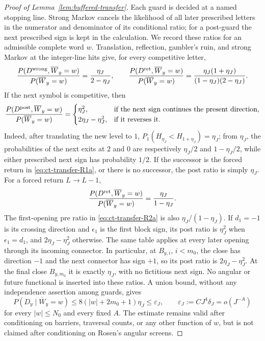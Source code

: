 \begin{proof}[Proof of Lemma~\ref{lem:buffered-transfer}]
Each guard is decided at a named stopping line. Strong Markov cancels the
likelihood of all later prescribed letters in the numerator and denominator
of its conditional ratio; for a post-guard the next prescribed sign is kept
in the calculation. We record these ratios for an admissible complete word
$w$.  Translation, reflection, gambler's ruin, and strong Markov at the
integer-line hits give, for every competitive letter,
\begin{equation}
\frac{P(D^{\rm wrong},\overline W_y=w)}{P(\overline W_y=w)}
       =\frac{\eta_J}{2-\eta_J},\qquad
 \frac{P(D^{\rm ret},\overline W_y=w)}{P(\overline W_y=w)}
       =\frac{\eta_J(1+\eta_J)}
          {(1-\eta_J)(2-\eta_J)}.\label{eq:ct-transfer-R2b}
\end{equation}
If the next symbol is competitive, then
\begin{equation}
\frac{P(D^{\rm post},\overline W_y=w)}{P(\overline W_y=w)}
 =\begin{cases}
    \eta_J^2,&\text{if the next sign continues the present direction},\\
    2\eta_J-\eta_J^2,&\text{if it reverses it}.
   \end{cases}\label{eq:ct-transfer-R2c}
\end{equation}
Indeed, after translating the new level to $1$,
$P_1(H_{\eta_J}<H_{1+\eta_J})=\eta_J$; from $\eta_J$, the
probabilities of the next exits at $2$ and $0$ are respectively
$\eta_J/2$ and $1-\eta_J/2$, while either prescribed next sign has
probability $1/2$.  If the successor is the forced return in \eqref{eq:ct-transfer-R1a}, or
there is no successor, the post ratio is simply $\eta_J$.  For a forced
return $L\to L-1$,
\begin{equation}
\frac{P(D^{\rm ret},\overline W_y=w)}{P(\overline W_y=w)}
       =\frac{\eta_J}{1-\eta_J}.\label{eq:ct-transfer-R2d}
\end{equation}
The first-opening pre ratio in \eqref{eq:ct-transfer-R2a} is also
$\eta_J/(1-\eta_J)$.  If $d_1=-1$ is its crossing direction and
$\epsilon_1$ is the first block sign, its post ratio is
$\eta_J^2$ when $\epsilon_1=d_1$, and
$2\eta_J-\eta_J^2$ otherwise.  The same table applies at every later
opening through its incoming connector.  In particular, at $B_{y,i}$,
$i<m_0$, the close has direction $-1$ and the next connector has sign
$+1$, so its post ratio is $2\eta_J-\eta_J^2$.  At the final close
$B_{y,m_0}$ it is exactly $\eta_J$, with no fictitious next sign.
No angular or future functional is inserted into these ratios. A union bound, without
any independence assertion among guards, gives
\begin{equation}
P(D_y\mid\overline W_y=w)
 \le8(|w|+2m_0+1)\eta_J
 \le\varepsilon_J,
 \qquad \varepsilon_J:=CJ^4\delta_J=o(J^{-A})\label{eq:ct-transfer-R3}
\end{equation}
for every $|w|\le N_0$ and every fixed $A$.  The estimate remains
valid after conditioning on barriers, traversal counts, or any other
function of $w$, but is not claimed after conditioning on Rosen's
angular screens.


\end{proof}
